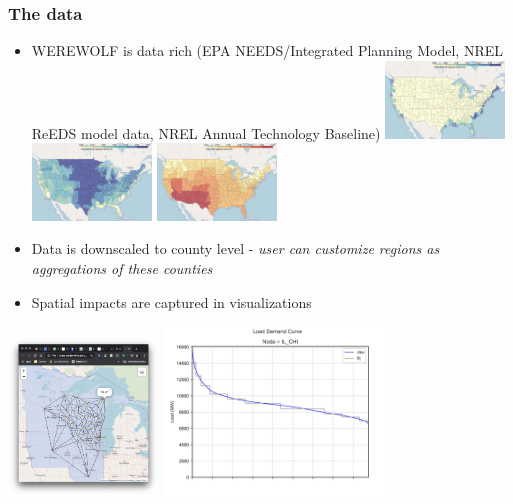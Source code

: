 \documentclass[xcolor=dvipsnames]{beamer}
\begin{document}
\begin{frame}
  \frametitle{The data}

\begin{itemize}
  \item WEREWOLF is data rich (EPA NEEDS/Integrated Planning Model, NREL ReEDS model data, NREL Annual Technology Baseline)
  \includegraphics[width=0.25\textwidth]{includes/data_offshore_wind.png}\hspace*{0.2in}
  \includegraphics[width=0.25\textwidth]{includes/data_onshore_wind.png}\hspace*{0.2in}
  \includegraphics[width=0.25\textwidth]{includes/data_solar.png}
  \item Data is downscaled to county level - \emph{user can customize regions as aggregations of these counties}
  \item Spatial impacts are captured in visualizations
\end{itemize}
\centering
  \includegraphics[width=0.30\textwidth]{includes/data_network_browser_view.png}\hspace*{0.2in}
%
  \includegraphics[width=0.45\textwidth]{includes/LDC_node_IL_CHI.png}

\end{frame}
\end{document}
